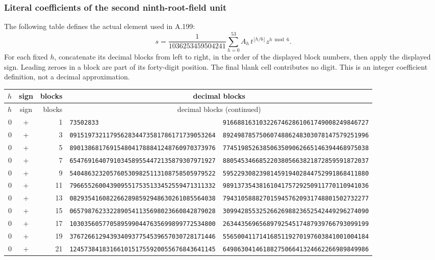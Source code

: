 \subsubsection*{Literal coefficients of the second ninth-root-field unit}
The following table defines the actual element used in A.199:
\[
 s=\frac1{1036253459504241}\sum_{h=0}^{53}A_h\,
       t^{\lfloor h/6\rfloor}z^{h\bmod6}.
\]
For each fixed $h$, concatenate its decimal blocks from left to right,
in the order of the displayed block numbers, then apply the displayed
sign. Leading zeroes in a block are part of its forty-digit position.
The final blank cell contributes no digit. This is an integer coefficient
definition, not a decimal approximation.
\begingroup
\fontsize{7.6}{9.1}\selectfont
\setlength{\tabcolsep}{3pt}
\begin{longtable}{@{}rcrll@{}}
$h$&sign&blocks&\multicolumn{2}{c}{decimal blocks}\\\hline
\endfirsthead
$h$&sign&blocks&\multicolumn{2}{c}{decimal blocks (continued)}\\\hline
\endhead
0&+&1&\texttt{73502833}&\texttt{9166881631032267462861061749008249846727}\\
0&+&3&\texttt{0915197321179562834473581786171739053264}&\texttt{8924987857506074886248303078147579251996}\\
0&+&5&\texttt{8901386817691548041788841248760970373976}&\texttt{7745198526385063509062665146394468975038}\\
0&+&7&\texttt{6547691640791034589554472135879307971927}&\texttt{8805453466852203805663821872859591872037}\\
0&+&9&\texttt{5404863232057605309825113108758505979522}&\texttt{5952293082398145919402844752991868411880}\\
0&+&11&\texttt{7966552600439095517535133452559471311332}&\texttt{9891373543816104175729250911770110941036}\\
0&+&13&\texttt{0829354160822662898592948630261085564038}&\texttt{7943105888270159457620931748801502732277}\\
0&+&15&\texttt{0657987623322890541135698023660842879028}&\texttt{3099428553252662698823652542449296274090}\\
0&+&17&\texttt{1030356057705895990447635699899772534800}&\texttt{2634435696568979254517487939766793099199}\\
0&+&19&\texttt{3767266129439340937754539657030728171446}&\texttt{5565004117141685119270197603841001004184}\\
0&+&21&\texttt{1245738418316610151755920055676843641145}&\texttt{6498630414618827506641324662266989849986}\\

\end{longtable}
